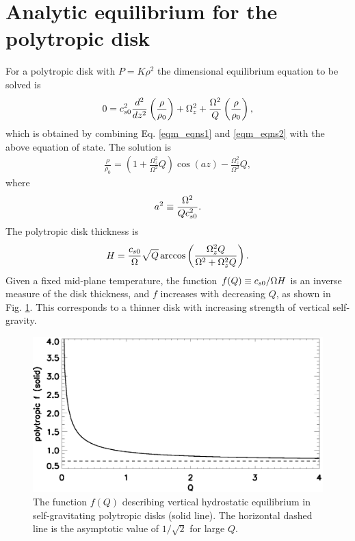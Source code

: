 \section{Analytic equilibrium for the polytropic disk}\label{appen1}
For a polytropic disk with $P = K\rho^2$ the dimensional equilibrium equation to
be solved is 
\begin{align}
  0=c_{s0}^2\frac{d^2}{dz^2}\left(\frac{\rho}{\rho_0}\right) +
  \Omega_z^2 + \frac{\Omega^2}{Q}\left(\frac{\rho}{\rho_0}\right), 
\end{align}
which is obtained by combining Eq. \ref{eqm_eqns1} and
\ref{eqm_eqns2} with the above equation of state. The solution is
\begin{align}  
  \frac{\rho}{\rho_0} = \left(1 + \frac{\Omega_z^2}{\Omega^2}Q\right)\cos{\left(a z\right)} - 
  \frac{\Omega_z^2}{\Omega^2}Q,  
\end{align}
where  
\begin{align}
  a^2 \equiv \frac{\Omega^2}{Qc_{s0}^2}. 
\end{align}
The polytropic disk thickness is
\begin{align}
  H =
  \frac{c_{s0}}{\Omega}\sqrt{Q}\arccos\left(\frac{\Omega_z^2Q}{\Omega^2+ \Omega_z^2Q}\right).  
\end{align}
Given a fixed mid-plane temperature, the function $f(Q)\equiv
c_{s0}/\Omega H$ is an inverse measure of the disk thickness, and $f$ increases with decreasing $Q$,
as shown in Fig. \ref{plot_fq}. This corresponds to a thinner disk
with increasing strength of vertical self-gravity.

\begin{figure}
  \includegraphics[width=\linewidth]{figures/plot_fq}
  \caption{The function $f(Q)$ describing vertical hydrostatic 
    equilibrium in self-gravitating polytropic disks (solid line). The
    horizontal dashed line is the asymptotic value of $1/\sqrt{2}$ for
    large $Q$.  
    \label{plot_fq}}
\end{figure}

